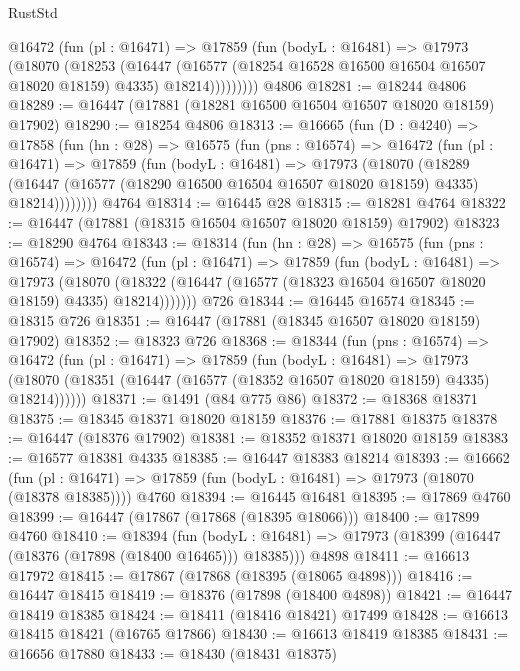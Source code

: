 \begin{lexlean}{RustStd}
\begin{coremodule}
          @16472
            (fun (pl : @16471) =>
            @17859
              (fun (bodyL : @16481) =>
              @17973
                (@18070
                  (@18253
                    (@16447
                      (@16577 (@18254 @16528 @16500 @16504 @16507 @18020 @18159) @4335)
                      @18214)))))))))
    @4806
@18281 := @18244 @4806
@18289 := @16447 (@17881 (@18281 @16500 @16504 @16507 @18020 @18159) @17902)
@18290 := @18254 @4806
@18313 := @16665
    (fun (D : @4240) =>
    @17858
      (fun (hn : @28) =>
      @16575
        (fun (pns : @16574) =>
        @16472
          (fun (pl : @16471) =>
          @17859
            (fun (bodyL : @16481) =>
            @17973
              (@18070
                (@18289
                  (@16447 (@16577 (@18290 @16500 @16504 @16507 @18020 @18159) @4335) @18214))))))))
    @4764
@18314 := @16445 @28
@18315 := @18281 @4764
@18322 := @16447 (@17881 (@18315 @16504 @16507 @18020 @18159) @17902)
@18323 := @18290 @4764
@18343 := @18314
    (fun (hn : @28) =>
    @16575
      (fun (pns : @16574) =>
      @16472
        (fun (pl : @16471) =>
        @17859
          (fun (bodyL : @16481) =>
          @17973
            (@18070
              (@18322 (@16447 (@16577 (@18323 @16504 @16507 @18020 @18159) @4335) @18214)))))))
    @726
@18344 := @16445 @16574
@18345 := @18315 @726
@18351 := @16447 (@17881 (@18345 @16507 @18020 @18159) @17902)
@18352 := @18323 @726
@18368 := @18344
    (fun (pns : @16574) =>
    @16472
      (fun (pl : @16471) =>
      @17859
        (fun (bodyL : @16481) =>
        @17973 (@18070 (@18351 (@16447 (@16577 (@18352 @16507 @18020 @18159) @4335) @18214))))))
@18371 := @1491 (@84 @775 @86)
@18372 := @18368 @18371
@18375 := @18345 @18371 @18020 @18159
@18376 := @17881 @18375
@18378 := @16447 (@18376 @17902)
@18381 := @18352 @18371 @18020 @18159
@18383 := @16577 @18381 @4335
@18385 := @16447 @18383 @18214
@18393 := @16662
    (fun (pl : @16471) => @17859 (fun (bodyL : @16481) => @17973 (@18070 (@18378 @18385))))
    @4760
@18394 := @16445 @16481
@18395 := @17869 @4760
@18399 := @16447 (@17867 (@17868 (@18395 @18066)))
@18400 := @17899 @4760
@18410 := @18394
    (fun (bodyL : @16481) => @17973 (@18399 (@16447 (@18376 (@17898 (@18400 @16465))) @18385)))
    @4898
@18411 := @16613 @17972
@18415 := @17867 (@17868 (@18395 (@18065 @4898)))
@18416 := @16447 @18415
@18419 := @18376 (@17898 (@18400 @4898))
@18421 := @16447 @18419 @18385
@18424 := @18411 (@18416 @18421) @17499
@18428 := @16613 @18415 @18421 (@16765 @17866)
@18430 := @16613 @18419 @18385
@18431 := @16656 @17880
@18433 := @18430 (@18431 @18375)

\end{coremodule}
\end{lexlean}
